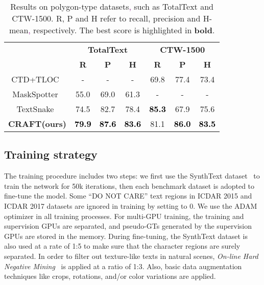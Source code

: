 \documentclass[10pt,twocolumn,letterpaper]{article}
\newcommand\jh[1]{\textcolor{purple}{#1}}
\begin{document}
\begin{table}[t!]
  \centering
\tabcolsep=0.12cm
  \fontsize{10}{10}\selectfont
  \renewcommand*{\arraystretch}{1.1}
  \begin{tabular}{c||c|c|c||c|c|c}
    \hline  
    \rule{0pt}{10pt} \multirow{2}{*}{\textbf{Method}} & \multicolumn{3}{c||}{\textbf{TotalText}} & \multicolumn{3}{c}{\textbf{CTW-1500}}\\
    \cline{2-7}
    \rule{0pt}{10pt} & \textbf{R} & \textbf{P} & \textbf{H} & \textbf{R} & \textbf{P} & \textbf{H}\\
    \hline
    \hline
    CTD+TLOC~\cite{yuliang2017detecting} & - & - & - & 69.8	& 77.4 & 73.4 \\
    MaskSpotter~\cite{lyu2018mask} & 55.0 & 69.0 & 61.3 & - & - & - \\
    TextSnake~\cite{long2018textsnake} &	74.5 & 82.7 & 78.4 & \textcolor{black}{\textbf{85.3}} & 67.9 & 75.6 \\
\hline
    \hline
    \rule{0pt}{10pt} \textbf{CRAFT(ours)} & \textcolor{black}{\textbf{79.9}} & \textcolor{black}{\textbf{87.6}} & \textcolor{black}{\textbf{83.6}} & 81.1 & \textcolor{black}{\textbf{86.0}} & \textcolor{black}{\textbf{83.5}}\\
    \hline
  \end{tabular}
  \vspace{3mm}
  \caption{Results on polygon-type datasets\jh{,} such as TotalText and CTW-1500. R, P and H refer to recall, precision and H-mean\jh{,} respectively. The best score is highlighted in {\textbf{bold}}.}
  \vspace{-3mm}
  \label{tab:result_poly}
\end{table}


\subsection{Training strategy}
The training procedure includes two steps: we first use the SynthText dataset~\cite{gupta2016synthetic} to train the network for 50k iterations, then each benchmark dataset is adopted to fine-tune the model. Some “DO NOT CARE” text regions in ICDAR 2015 and ICDAR 2017 datasets are ignored in training by setting  to 0. We use the ADAM~\cite{kingma2015adam} optimizer in all training processes. For multi-GPU training, the training and supervision GPUs are separated, and pseudo-GTs generated by the supervision GPUs are stored in the memory. During fine-tuning, the SynthText dataset is also used at a rate of 1:5 to make sure that the character regions are surely separated.
In order to filter out texture-like texts in natural scenes, \textit{On-line Hard Negative Mining}~\cite{shrivastava2016training} is applied at a ratio of 1:3. Also, basic data augmentation techniques like crops, rotations, and/or color variations are applied. 
\end{document}
